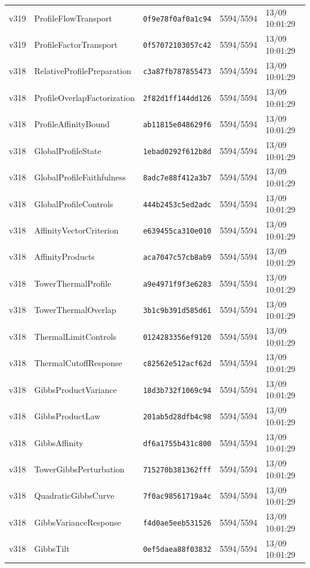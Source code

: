 \documentclass[11pt]{article}
\theoremstyle{definition}\newtheorem{deriv}{Derivação}
\begin{document}
{\begin{longtable}{@{}lllll@{}}
v319 & ProfileFlowTransport & \texttt{0f9e78f0af0a1c94} & 5594/5594 & 13/09 10:01:29 \\
v319 & ProfileFactorTransport & \texttt{0f57072103057c42} & 5594/5594 & 13/09 10:01:29 \\
v318 & RelativeProfilePreparation & \texttt{c3a87fb787855473} & 5594/5594 & 13/09 10:01:29 \\
v318 & ProfileOverlapFactorization & \texttt{2f82d1ff144dd126} & 5594/5594 & 13/09 10:01:29 \\
v318 & ProfileAffinityBound & \texttt{ab11815e048629f6} & 5594/5594 & 13/09 10:01:29 \\
v318 & GlobalProfileState & \texttt{1ebad0292f612b8d} & 5594/5594 & 13/09 10:01:29 \\
v318 & GlobalProfileFaithfulness & \texttt{8adc7e88f412a3b7} & 5594/5594 & 13/09 10:01:29 \\
v318 & GlobalProfileControls & \texttt{444b2453c5ed2adc} & 5594/5594 & 13/09 10:01:29 \\
v318 & AffinityVectorCriterion & \texttt{e639455ca310e010} & 5594/5594 & 13/09 10:01:29 \\
v318 & AffinityProducts & \texttt{aca7047c57cb8ab9} & 5594/5594 & 13/09 10:01:29 \\
v318 & TowerThermalProfile & \texttt{a9e4971f9f3e6283} & 5594/5594 & 13/09 10:01:29 \\
v318 & TowerThermalOverlap & \texttt{3b1c9b391d585d61} & 5594/5594 & 13/09 10:01:29 \\
v318 & ThermalLimitControls & \texttt{0124283356ef9120} & 5594/5594 & 13/09 10:01:29 \\
v318 & ThermalCutoffResponse & \texttt{c82562e512acf62d} & 5594/5594 & 13/09 10:01:29 \\
v318 & GibbsProductVariance & \texttt{18d3b732f1069c94} & 5594/5594 & 13/09 10:01:29 \\
v318 & GibbsProductLaw & \texttt{201ab5d28dfb4c98} & 5594/5594 & 13/09 10:01:29 \\
v318 & GibbsAffinity & \texttt{df6a1755b431c800} & 5594/5594 & 13/09 10:01:29 \\
v318 & TowerGibbsPerturbation & \texttt{715270b381362fff} & 5594/5594 & 13/09 10:01:29 \\
v318 & QuadraticGibbsCurve & \texttt{7f0ac98561719a4c} & 5594/5594 & 13/09 10:01:29 \\
v318 & GibbsVarianceResponse & \texttt{f4d0ae5eeb531526} & 5594/5594 & 13/09 10:01:29 \\
v318 & GibbsTilt & \texttt{0ef5daea88f03832} & 5594/5594 & 13/09 10:01:29 \\

\end{longtable}}
\end{document}
